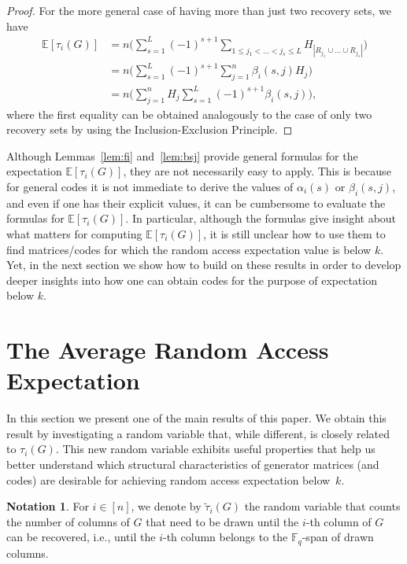 \documentclass[11pt,a4paper,reqno,twoside]{amsart}
\theoremstyle{definition}
\newtheorem{notation}{Notation}
\newcommand{\F}{\mathbb{F}}
\newcommand{\E}{\mathbb{E}}
\begin{document}
\begin{proof}
For the more general case of having more than just two recovery sets, we have
\begin{align*}
   \E[\tau_i(G)] &= n \Bigg( \sum_{s=1}^L (-1)^{s+1} \sum_{1 \le j_1 < \dots < j_s \le L} H_{|R_{j_1} \cup \dots \cup R_{j_s}|} \Bigg) \\
   &= n \Bigg( \sum_{s=1}^L (-1)^{s+1} \sum_{j=1}^{n} \beta_i(s,j) H_j \Bigg) \\
   &= n \Bigg( \sum_{j=1}^{n} H_j \sum_{s=1}^L (-1)^{s+1} \beta_i(s,j) \Bigg),
\end{align*}
where the first equality can be obtained analogously to the case of only two recovery sets by using the Inclusion-Exclusion Principle.
\end{proof}

Although Lemmas~\ref{lem:fi} and~\ref{lem:bsj} provide general formulas for the expectation $\E[\tau_i(G)]$, they are not necessarily easy to apply. This is because for general codes it is not immediate to derive the values of $\alpha_i(s)$ or $\beta_i(s,j)$, and even if one has their explicit values, it can be cumbersome to evaluate the formulas for $\E[\tau_i(G)]$. In particular, although the formulas give insight about what matters for computing $\E[\tau_i(G)]$, it is still unclear how to use them to find matrices/codes for which the random access expectation value is below $k$. Yet, in the next section we show how to build on these results in order to develop deeper insights into how one can obtain codes for the purpose of expectation below $k$.

\section{The Average Random Access Expectation}\label{sec:average}

In this section we present one of the main results of this paper. We obtain this result by investigating a random variable that, while different, is closely related to $\tau_i(G)$. This new random variable exhibits useful properties that help us better understand which structural characteristics of generator matrices (and codes) are desirable for achieving random access expectation below~$k$.

\begin{notation}
For $i \in [n]$, we denote by $\widetilde{\tau}_i(G)$ the random variable that counts the number of columns of $G$ that need to be drawn until the $i$-th column of $G$ can be recovered, i.e., until the $i$-th column belongs to the $\F_q$-span of drawn columns.
\end{notation}
\end{document}
